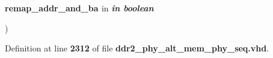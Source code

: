 {\begin{DoxyParamCaption}
\item[{}]{{\bfseries \textcolor{vhdlchar}{remap\+\_\+addr\+\_\+and\+\_\+ba}\textcolor{vhdlchar}{ }}\textcolor{stringliteral}{in} {\em {\bfseries \textcolor{keywordflow}{in}\textcolor{vhdlchar}{ }\textcolor{comment}{boolean}\textcolor{vhdlchar}{ }\textcolor{vhdlchar}{ }\textcolor{vhdlchar}{ }}}}
\end{DoxyParamCaption}
)\hspace{0.3cm}{\ttfamily [Function]}}\label{class__ddr2__phy__alt__mem__phy__addr__cmd__pkg_a1fa917153d49dd3b0e61b62aaaf3f79e}


Definition at line {\bf 2312} of file {\bf ddr2\+\_\+phy\+\_\+alt\+\_\+mem\+\_\+phy\+\_\+seq.\+vhd}.

